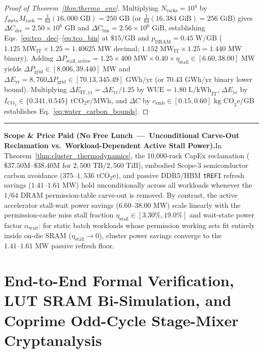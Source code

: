 \documentclass[10pt,twocolumn]{article}
\makeatletter
\newif\ifspecintwocol \specintwocolfalse
\newif\ifspecresume   \specresumefalse
\newcommand{\StartTwoCol}{%
  \if@twocolumn
    \let\spec@next\@empty
  \else
    \ifspecintwocol
      \let\spec@next\@empty
    \else
      \global\specintwocoltrue
      \def\spec@next{\begin{multicols}{2}}%
    \fi
  \fi
  \spec@next
}
\newcommand{\EndConnesPlate}{%
  \par\vspace{3pt}\noindent\textcolor{black!25}{\rule{\textwidth}{0.4pt}}\par\vspace{4pt}%
  \ifspecresume
    \global\specresumefalse
    \let\spec@platepost\StartTwoCol
  \else
    \let\spec@platepost\@empty
  \fi
  \spec@platepost
}
\theoremstyle{spectralthm}
\makeatother
\begin{document}
\begin{proof}[Proof of Theorem~\ref{thm:thermo_env}]
Multiplying $N_{\mathrm{racks}} = 10^4$ by $f_{\mathrm{meta}} M_{\mathrm{rack}} = \frac{1}{64}(16,000\text{~GB}) = 250\text{~GB}$ (or $\frac{1}{64}(16,384\text{~GiB}) = 256\text{~GiB}$) gives $\Delta C_{\mathrm{dec}} = 2.50\times 10^6\text{~GB}$ and $\Delta C_{\mathrm{bin}} = 2.56\times 10^6\text{~GiB}$, establishing Eqs.~\eqref{eq:tco_dec}--\eqref{eq:tco_bin} at $\$15/\text{GB}$ and $p_{\mathrm{DRAM}} = 0.45\text{~W/GB}$ ($1.125\text{~MW}_{\mathrm{IT}} \times 1.25 = 1.40625\text{~MW}$ decimal; $1.152\text{~MW}_{\mathrm{IT}} \times 1.25 = 1.440\text{~MW}$ binary). Adding $\Delta P_{\mathrm{stall,active}} = 1.25 \times 400\text{~MW} \times 0.40 \times \eta_{\mathrm{stall}} \in [6.60, 38.00]\text{~MW}$ yields $\Delta P_{\mathrm{grid}} \in [8.006, 39.440]\text{~MW}$ and $\Delta E_{\mathrm{yr}} = 8,760 \Delta P_{\mathrm{grid}} \in [70.13, 345.49]\text{~GWh/yr}$ (or $70.43\text{~GWh/yr}$ binary lower bound). Multiplying $\Delta E_{\mathrm{IT,yr}} = \Delta E_{\mathrm{yr}}/1.25$ by $\mathrm{WUE} = 1.80\text{~L/kWh}_{\mathrm{IT}}$, $\Delta E_{\mathrm{yr}}$ by $I_{\mathrm{CO_2}} \in \{0.341, 0.545\}\text{~tCO}_2\text{e/MWh}$, and $\Delta C$ by $c_{\mathrm{emb}} \in [0.15, 0.60]\text{~kg CO}_2\text{e/GB}$ establishes Eq.~\eqref{eq:water_carbon_bounds}.
\end{proof}
\EndConnesPlate

\par\medskip\noindent\textbf{Scope \& Price Paid (No Free Lunch~---~Unconditional Carve-Out Reclamation vs.\ Workload-Dependent Active Stall Power).}\;In Theorem~\ref{thm:cluster_thermodynamics}, the 10,000-rack CapEx reclamation ($\text{\$37.50M--\$38.40M}$ for $2,500\text{~TB} / 2,560\text{~TiB}$), embodied Scope-3 semiconductor carbon avoidance ($375\text{--}1,536\text{~tCO}_2\text{e}$), and passive DDR5/HBM \texttt{tREFI} refresh savings ($1.41\text{--}1.61\text{~MW}$) hold unconditionally across all workloads whenever the $1/64$ DRAM permission-table carve-out is removed. By contrast, the active accelerator stall-wait power savings ($6.60\text{--}38.00\text{~MW}$) scale linearly with the permission-cache miss stall fraction $\eta_{\mathrm{stall}} \in [3.30\%, 19.0\%]$ and wait-state power factor $\alpha_{\mathrm{wait}}$: for static batch workloads whose permission working sets fit entirely inside on-die SRAM ($\eta_{\mathrm{stall}} \to 0$), cluster power savings converge to the $1.41\text{--}1.61\text{~MW}$ passive refresh floor.

\section{End-to-End Formal Verification, LUT SRAM Bi-Simulation, and Coprime Odd-Cycle Stage-Mixer Cryptanalysis}
\label{sec:formal}
\end{document}
